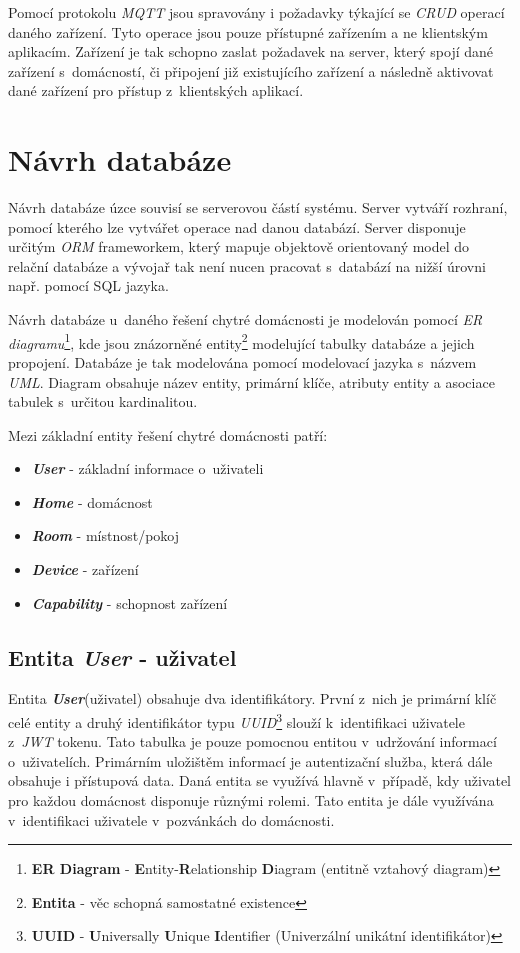Pomocí protokolu \emph{MQTT} jsou spravovány i požadavky týkající se \emph{CRUD} operací daného zařízení.
Tyto operace jsou pouze přístupné zařízením a ne klientským aplikacím.
Zařízení je tak schopno zaslat požadavek na server, který spojí dané zařízení s~domácností, či připojení již existujícího zařízení a následně aktivovat dané zařízení pro přístup z~klientských aplikací.

\newpage
\section{Návrh databáze}
\label{navrh:databaze}

Návrh databáze úzce souvisí se serverovou částí systému. Server vytváří rozhraní, pomocí kterého lze vytvářet operace nad danou databází.
Server disponuje určitým \emph{ORM} frameworkem, který mapuje objektově orientovaný model do relační databáze a vývojař tak není nucen pracovat s~databází na nižší úrovni např. pomocí SQL jazyka.

Návrh databáze u~daného řešení chytré domácnosti je modelován pomocí \emph{ER diagramu}\footnote{\textbf{ER Diagram} - \textbf{E}ntity-\textbf{R}elationship \textbf{D}iagram (entitně vztahový diagram)}, kde jsou znázorněné entity\footnote{\textbf{Entita} - věc schopná samostatné existence} modelující tabulky databáze a jejich propojení.
Databáze je tak modelována pomocí modelovací jazyka s~názvem \emph{UML}.
Diagram obsahuje název entity, primární klíče, atributy entity a asociace tabulek s~určitou kardinalitou.

Mezi základní entity řešení chytré domácnosti patří:
\begin{itemize}
  \item \textbf{\emph{User}} - základní informace o~uživateli
  \item \textbf{\emph{Home}} - domácnost
  \item \textbf{\emph{Room}} - místnost/pokoj
  \item \textbf{\emph{Device}} - zařízení
  \item \textbf{\emph{Capability}} - schopnost zařízení
\end{itemize}

\subsection*{Entita \emph{User} - uživatel}
\label{databaze:user}
Entita \textbf{\emph{User}}(uživatel) obsahuje dva identifikátory. První z~nich je primární klíč celé entity a druhý identifikátor typu \emph{UUID}\footnote{\textbf{UUID} - \textbf{U}niversally \textbf{U}nique \textbf{I}dentifier (Univerzální unikátní identifikátor)} slouží k~identifikaci uživatele z~\emph{JWT} tokenu.
Tato tabulka je pouze pomocnou entitou v~udržování informací o~uživatelích. Primárním uložištěm informací je autentizační služba, která dále obsahuje i přístupová data.
Daná entita se využívá hlavně v~případě, kdy uživatel pro každou domácnost disponuje různými rolemi. Tato entita je dále využívána v~identifikaci uživatele v~pozvánkách do domácnosti.

